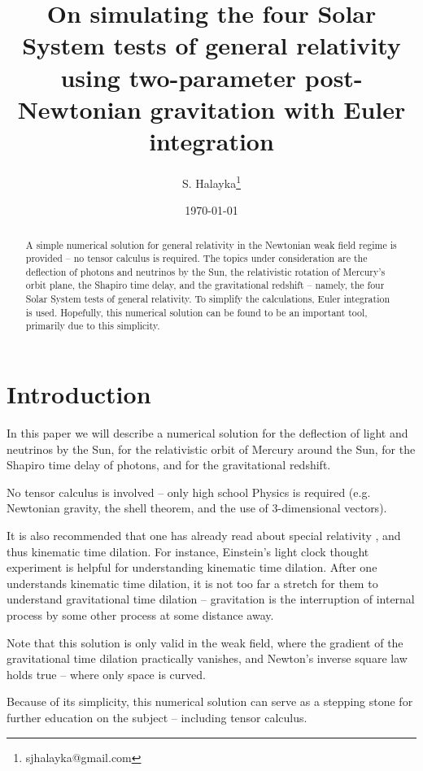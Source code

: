 \documentclass[12pt]{article}
\title{On simulating the four Solar System tests of general relativity using two-parameter post-Newtonian gravitation with Euler integration}
\author{S. Halayka\footnote{sjhalayka@gmail.com}}
\date{\today\;\currenttime}
\begin{document}
 
\maketitle

\begin{abstract}
A simple numerical solution for general relativity in the Newtonian weak field regime is provided -- no tensor calculus is required.
The topics under consideration are the deflection of photons and neutrinos by the Sun, the relativistic rotation of Mercury's orbit plane, the Shapiro time delay, and the gravitational redshift -- namely, the four Solar System tests of general relativity.
To simplify the calculations, Euler integration is used.
Hopefully, this numerical solution can be found to be an important tool, primarily due to this simplicity.
\end{abstract}


\section{Introduction}

In this paper we will describe a numerical solution for the deflection of light and neutrinos by the Sun, for the relativistic orbit of Mercury around the Sun, for the Shapiro time delay of photons, and for the gravitational redshift.

No tensor calculus is involved -- only high school Physics is required (e.g. Newtonian gravity, the shell theorem, and the use of 3-dimensional vectors).

It is also recommended that one has already read about special relativity \cite{einstein, morin}, and thus kinematic time dilation.
For instance, Einstein's light clock thought experiment is helpful for understanding kinematic time dilation.
After one understands kinematic time dilation, it is not too far a stretch for them to understand gravitational time dilation -- gravitation is the interruption of internal process by some other process at some distance away.

Note that this solution is only valid in the weak field, where the gradient of the gravitational time dilation practically vanishes, and Newton's inverse square law holds true -- where only space is curved.

Because of its simplicity, this numerical solution can serve as a stepping stone for further education on the subject -- including tensor calculus.
\end{document}
